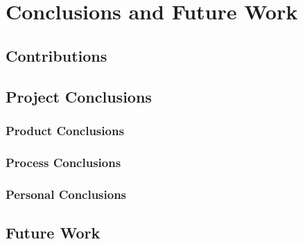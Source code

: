 \chapter{Conclusions and Future Work}\label{chap:conclusions}



\section{Contributions}  %



\section{Project Conclusions}



\subsection{Product Conclusions}



\subsection{Process Conclusions}



\subsection{Personal Conclusions}



\section{Future Work}

